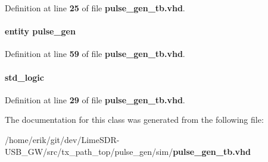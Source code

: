 Definition at line {\bf 25} of file {\bf pulse\+\_\+gen\+\_\+tb.\+vhd}.

\paragraph[{pulse\+\_\+gen\+\_\+dut0}]{ {\bfseries \textcolor{keywordflow}{entity}\textcolor{vhdlchar}{ }\textcolor{vhdlchar}{pulse\+\_\+gen}\textcolor{vhdlchar}{ }} \hspace{0.3cm}{\ttfamily [Instantiation]}}\label{classpulse__gen__tb_1_1tb__behave_abe75e2dff8627cb151541509f93239c0}


Definition at line {\bf 59} of file {\bf pulse\+\_\+gen\+\_\+tb.\+vhd}.

\paragraph[{reset\+\_\+n}]{ {\bfseries \textcolor{comment}{std\+\_\+logic}\textcolor{vhdlchar}{ }} \hspace{0.3cm}{\ttfamily [Signal]}}\label{classpulse__gen__tb_1_1tb__behave_a1f070fd63a3a7fa45c907335ea870c5b}


Definition at line {\bf 29} of file {\bf pulse\+\_\+gen\+\_\+tb.\+vhd}.



The documentation for this class was generated from the following file\+:\begin{DoxyCompactItemize}
\item 
/home/erik/git/dev/\+Lime\+S\+D\+R-\/\+U\+S\+B\+\_\+\+G\+W/src/tx\+\_\+path\+\_\+top/pulse\+\_\+gen/sim/{\bf pulse\+\_\+gen\+\_\+tb.\+vhd}\end{DoxyCompactItemize}
